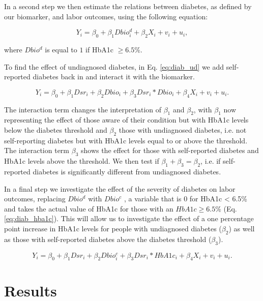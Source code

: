 \documentclass[12pt,english]{article}
\begin{document}
In a second step we then estimate the relations between diabetes, as defined by our biomarker, and labor outcomes, using the following equation:

\begin{equation}
Y_{i}=\beta_{0}+\beta_{1}Dbio^{d}_{i}+\beta_{2}X_{i}+v_{i}+u_{i}\label{eq:diab},
\end{equation}

where $Dbio^{d}$ is equal to $1$ if \ac{HbA1c} $\geq6.5\%$. 

To find the effect of undiagnosed diabetes, in Eq. \ref{eq:diab_ud} we add self-reported diabetes back in and interact it with the biomarker.

\begin{equation}
Y_{i}=\beta_{0}+\beta_{1}Dsr_{i}+\beta_{2}Dbio_{i}+\beta_{3}Dsr_{i}*Dbio_{i}+\beta_{4}X_{i}+v_{i}+u_{i}.\label{eq:diab_ud}
\end{equation}

The interaction term changes the interpretation of $\beta_{1}$ and $\beta_{2}$, with $\beta_{1}$ now representing the effect of those aware of their condition but with \ac{HbA1c} levels below the diabetes threshold and $\beta_{2}$ those with undiagnosed diabetes, i.e. not self-reporting diabetes but with \ac{HbA1c} levels equal to or above the threshold. The interaction term $\beta_{3}$ shows the effect for those with self-reported diabetes and \ac{HbA1c} levels above the threshold. We then test if $\beta_{1} + \beta_{3} = \beta_{2}$, i.e. if self-reported diabetes is significantly different from undiagnosed diabetes.

In a final step we investigate the effect of the severity of diabetes on labor outcomes,
replacing $Dbio^{d}$ with $Dbio^{c}$ , a variable that is 0 for HbA1c < 6.5\% and takes the actual
value of \ac{HbA1c} for those with an $HbA1c \geq 6.5\%$ (Eq. \ref{eq:diab_hba1c}). This will allow us to investigate
the effect of a one percentage point increase in \ac{HbA1c} levels for people with undiagnosed
diabetes ($\beta_{2}$) as well as those with self-reported diabetes above the diabetes threshold
($\beta_{3}$).

\begin{equation}
Y_{i}=\beta_{0}+\beta_{1}Dsr_{i}+\beta_{2}Dbio^{c}_{i}+\beta_{3}Dsr_{i}*HbA1c_{i}+\beta_{4}X_{i}+v_{i}+u_{i}.\label{eq:diab_hba1c}
\end{equation}

\section{\label{sec:cha_4_results}Results}
\end{document}
